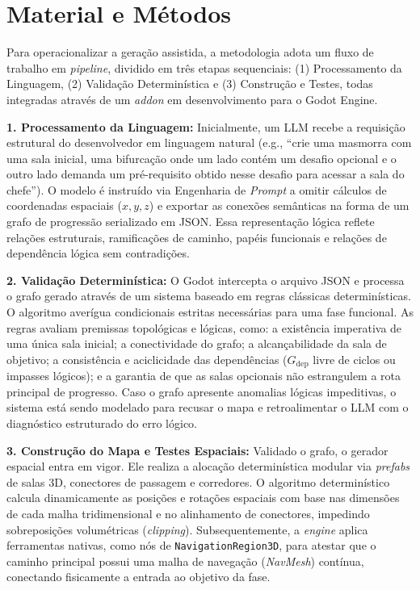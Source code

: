 \section{Material e Métodos}

Para operacionalizar a geração assistida, a metodologia adota um fluxo de trabalho em \textit{pipeline}, dividido em três etapas sequenciais: (1) Processamento da Linguagem, (2) Validação Determinística e (3) Construção e Testes, todas integradas através de um \textit{addon} em desenvolvimento para o Godot Engine.

\textbf{1. Processamento da Linguagem:} Inicialmente, um LLM recebe a requisição estrutural do desenvolvedor em linguagem natural (e.g., ``crie uma masmorra com uma sala inicial, uma bifurcação onde um lado contém um desafio opcional e o outro lado demanda um pré-requisito obtido nesse desafio para acessar a sala do chefe''). O modelo é instruído via Engenharia de \textit{Prompt} a omitir cálculos de coordenadas espaciais ($x, y, z$) e exportar as conexões semânticas na forma de um grafo de progressão serializado em JSON. Essa representação lógica reflete relações estruturais, ramificações de caminho, papéis funcionais e relações de dependência lógica sem contradições.

\textbf{2. Validação Determinística:} O Godot intercepta o arquivo JSON e processa o grafo gerado através de um sistema baseado em regras clássicas determinísticas. O algoritmo averígua condicionais estritas necessárias para uma fase funcional. As regras avaliam premissas topológicas e lógicas, como: a existência imperativa de uma única sala inicial; a conectividade do grafo; a alcançabilidade da sala de objetivo; a consistência e aciclicidade das dependências ($G_{\text{dep}}$ livre de ciclos ou impasses lógicos); e a garantia de que as salas opcionais não estrangulem a rota principal de progresso. Caso o grafo apresente anomalias lógicas impeditivas, o sistema está sendo modelado para recusar o mapa e retroalimentar o LLM com o diagnóstico estruturado do erro lógico.

\textbf{3. Construção do Mapa e Testes Espaciais:} Validado o grafo, o gerador espacial entra em vigor. Ele realiza a alocação determinística modular via \textit{prefabs} de salas 3D, conectores de passagem e corredores. O algoritmo determinístico calcula dinamicamente as posições e rotações espaciais com base nas dimensões de cada malha tridimensional e no alinhamento de conectores, impedindo sobreposições volumétricas (\textit{clipping}). Subsequentemente, a \textit{engine} aplica ferramentas nativas, como nós de \texttt{NavigationRegion3D}, para atestar que o caminho principal possui uma malha de navegação (\textit{NavMesh}) contínua, conectando fisicamente a entrada ao objetivo da fase.